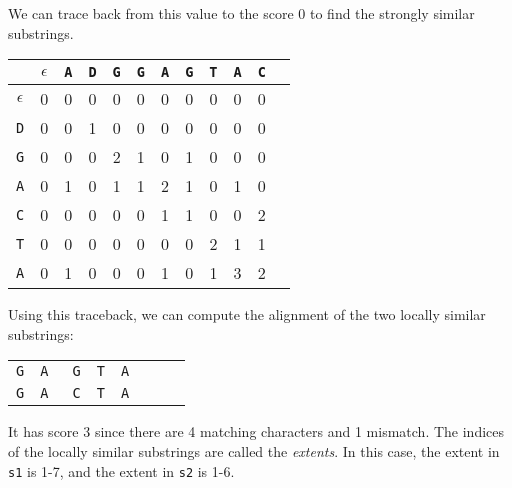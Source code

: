 \documentclass[a4paper, openany]{memoir}
\begin{document}
    We can trace back from this value to the score 0 to find the strongly similar substrings.
    \begin{table}[H]
        \centering
        \begin{tabular}{c|ccccccccccc}
            & $\epsilon$ & \texttt{A} & \texttt{D} & \texttt{G} & \texttt{G} & \texttt{A} & \texttt{G} & \texttt{T} & \texttt{A} & \texttt{C} \\
            \hline
            $\epsilon$ & 0 & 0 & 0 & 0 & 0 & 0 & 0 & 0 & 0 & 0 \\
            \texttt{D} & 0 & 0 & 1 & {\color{red} 0} & 0 & 0 & 0 & 0 & 0 & 0 \\
            \texttt{G} & 0 & 0 & 0 & 2 & {\color{red} 1} & 0 & 1 & 0 & 0 & 0 \\
            \texttt{A}& 0 & 1 & 0 & 1 & 1 & {\color{red} 2} & 1 & 0 & 1 & 0 \\
            \texttt{C} & 0 & 0 & 0 & 0 & 0 & 1 & {\color{red} 1} & 0 & 0 & 2 \\
            \texttt{T} & 0 & 0 & 0 & 0 & 0 & 0 & 0 & {\color{red} 2} & 1 & 1 \\
            \texttt{A} & 0 & 1 & 0 & 0 & 0 & 1 & 0 & 1 & {\color{red} 3} & 2
        \end{tabular}
    \end{table}
    \noindent Using this traceback, we can compute the alignment of the two locally similar substrings:
    \begin{table}[H]
        \centering
        \begin{tabular}{cccccccc}
            \texttt{G} & \texttt{A} & \texttt{\color{red} G} & \texttt{T} & \texttt{A} \\
            \texttt{G} & \texttt{A} & \texttt{\color{red} C} & \texttt{T} & \texttt{A}
        \end{tabular}
    \end{table}
    \noindent It has score 3 since there are 4 matching characters and 1 mismatch. The indices of the locally similar substrings are called the \emph{extents}. In this case, the extent in \texttt{s1} is 1-7, and the extent in \texttt{s2} is 1-6.
    
\end{document}
